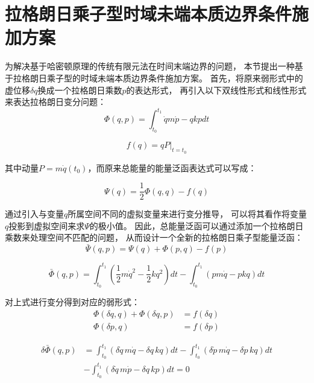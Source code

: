 \section{拉格朗日乘子型时域未端本质边界条件施加方案}

为解决基于哈密顿原理的传统有限元法在时间末端边界的问题，
本节提出一种基于拉格朗日乘子型的时域未端本质边界条件施加方案。
首先，将原来弱形式中的虚位移$\delta q$换成一个拉格朗日乘数$p$的表达形式，
再引入以下双线性形式和线性形式来表达拉格朗日变分问题：
\begin{equation}\label{2.16}
\Phi(q,p) = \int_{t_0}^{t_1} \dot q m \dot p - q k p dt 
\end{equation}

\begin{equation}\label{2.17}
f(q) = qP\vert_{t=t_0}
\end{equation}

其中动量$P = m\dot q(t_0)$，而原来总能量的能量泛函表达式可以写成：

\begin{equation}\label{2.18}
\Psi(q) = \frac{1}{2} \Phi(q,q) - f(q)
\end{equation}

通过引入与变量$q$所属空间不同的虚拟变量来进行变分推导，
可以将其看作将变量$q$投影到虚拟空间来求$\Psi$的极小值。
因此，总能量泛函可以通过添加一个拉格朗日乘数来处理空间不匹配的问题，
从而设计一个全新的拉格朗日乘子型能量泛函：
\begin{equation}\label{2.19}
\bar \Psi(q,p) = \Psi(q) + \Phi(p,q) - f(p)
\end{equation}

\begin{equation}\label{2.20}
\bar \Phi(q,p)=\int_{t_0}^{t_1} (\frac{1}{2} m \dot{q}^2 - \frac{1}{2} k q^2) dt 
- \int_{t_0}^{t_1} (p m \dot{q} - p k q) dt
\end{equation}

对上式进行变分得到对应的弱形式：
\begin{equation}\label{2.21}
\begin{split}
\Phi(\delta q, q) + \Phi(\delta q, p) &= f(\delta q) \\
\Phi(\delta p, q) &= f(\delta p)
\end{split}
\end{equation}

\begin{equation}\label{2.22}
\begin{split}
\delta \bar \Phi(q, p) &= \int_{t_0}^{t_1} (\delta \dot{q} \, m \dot{q} - \delta q \, k q) dt 
- \int_{t_0}^{t_1} (\delta \dot{p} \, m \dot{q} - \delta p \, k q) dt \\
&- \int_{t_0}^{t_1} (\delta \dot{q} \, m \dot{p} - \delta q \, k p) dt = 0
\end{split}
\end{equation}

